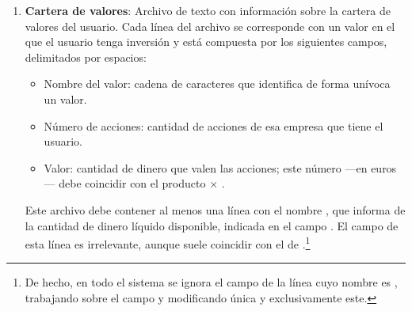 \documentclass[a4paper, 11pt, titlepage]{article}
\theoremstyle{definition}
\begin{document}
    \begin{enumerate}
        \item \textbf{Cartera de valores}: Archivo de texto con información sobre la cartera de valores del usuario. Cada línea del archivo se corresponde con un valor en el que el usuario tenga inversión y está compuesta por los siguientes campos, delimitados por espacios:
        \begin{itemize}
            \item Nombre del valor: cadena de caracteres que identifica de forma unívoca un valor.
            \item Número de acciones: cantidad de acciones de esa empresa que tiene el usuario.
            \item Valor: cantidad de dinero que valen las acciones; este número ---en euros--- debe coincidir con el producto  $\times$ .
        \end{itemize}
        Este archivo debe contener al menos una línea con el nombre , que informa de la cantidad de dinero líquido disponible, indicada en el campo . El campo  de esta línea es irrelevante, aunque suele coincidir con el de .\footnote{De hecho, en todo el sistema se ignora el campo  de la línea cuyo nombre es , trabajando sobre el campo  y modificando única y exclusivamente este.}


\end{enumerate}
\end{document}
